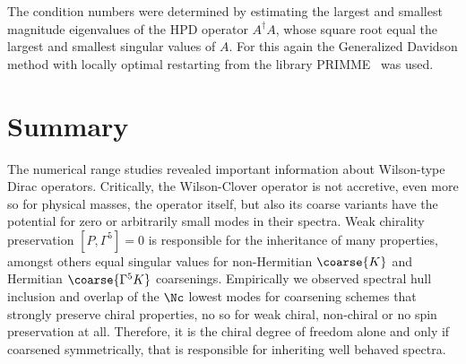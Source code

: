 The condition numbers were determined by estimating the largest and smallest magnitude eigenvalues of the HPD operator $A^{\dagger} A$, whose square root equal the largest and smallest singular values of $A$.
For this again the Generalized Davidson method with locally optimal restarting from the library PRIMME~\cite{primme} was used.












\section{Summary}
\label{sec:chirality:summary}



The numerical range studies revealed important information about Wilson-type Dirac operators.
Critically, the Wilson-Clover operator is not accretive, even more so for physical masses, \ie the operator itself, but also its coarse variants have the potential for zero or arbitrarily small modes in their spectra.
Weak chirality preservation $[P, \Gamma^{5}]=0$ is responsible for the inheritance of many properties, amongst others equal singular values for non-Hermitian $\coarse{K}$ and Hermitian $\coarse{\Gamma^{5} K}$ coarsenings.
Empirically we observed spectral hull inclusion and overlap of the $\Nc$ lowest modes for coarsening schemes that strongly preserve chiral properties, no so for weak chiral, non-chiral or no spin preservation at all.
Therefore, it is the chiral degree of freedom alone and only if coarsened symmetrically, that is responsible for inheriting well behaved spectra.


